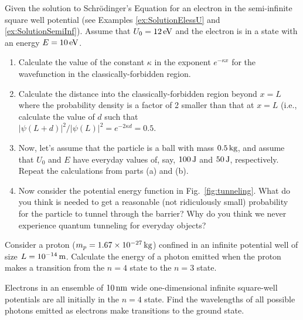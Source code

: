 

\begin{problem} 
Given the solution to Schr\"{o}dinger's Equation for an electron in the 
semi-infinite square well potential (see Examples \ref{ex:SolutionElessU}
and  \ref{ex:SolutionSemiInf}).
Assume that $U_0 = 12\,\mbox{eV}$ and the electron is in a state with 
an energy $E = 10\,\mbox{eV}$.
\begin{enumerate}
\item Calculate the value of the constant $\kappa$ in the exponent
$e^{-\kappa x}$ for the wavefunction
in the classically-forbidden region.
\item Calculate the distance into the classically-forbidden region 
beyond $x = L$ where the probability density is a factor of
2 smaller than that at $x = L$ (i.e., calculate the value of $d$
such that\\ $|\psi(L+d)|^2/|\psi(L)|^2 = e^{-2\kappa d} = 0.5$.
\item Now, let's assume that the particle is a ball with mass 
$0.5\,\mbox{kg}$, and assume that  $U_0$ and $E$ have everyday values 
of, say, $100\,\mbox{J}$ and $50\,\mbox{J}$, 
respectively. Repeat the calculations from parts (a) and (b).
\item Now consider the potential energy function in Fig.~\ref{fig:tunneling}.
What do you think is needed to get a reasonable (not ridiculously small)
probability for the particle to tunnel through the barrier?
Why do you think we never experience quantum tunneling for
everyday objects?
\end{enumerate}
\label{prob:TunnelSemiInfinite}
\end{problem}


\begin{problem}
  Consider a proton ($m_p = 1.67 \times 10^{-27}\,\mbox{kg}$) confined
  in an infinite potential well of size $L =
  10^{-14}\,\mbox{m}$. Calculate the energy of a photon emitted when
  the proton makes a transition from the $n=4$ state to the $n=3$
  state.
\end{problem}


\begin{problem}
Electrons in an ensemble of $10\,\mbox{nm}$ wide one-dimensional 
infinite square-well potentials are all initially in the 
$n=4$ state.  Find the wavelengths of all possible photons emitted 
as electrons make transitions to the ground state.
\label{prob:EmittedWavelengths}
\end{problem}

